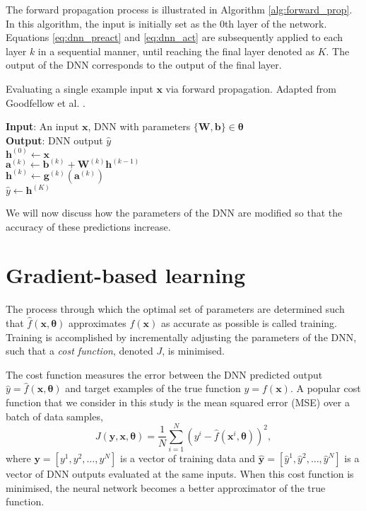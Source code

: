 The forward propagation process is illustrated in Algorithm \ref{alg:forward_prop}.
In this algorithm, the input is initially set as the 0th layer of the network.
Equations \ref{eq:dnn_preact} and \ref{eq:dnn_act} are subsequently applied to each layer $k$ in a sequential manner, until reaching the final layer denoted as $K$.
The output of the DNN corresponds to the output of the final layer.

\begin{algorithm}[htb!]
\caption[Evaluating a single example input via forward propagation]{Evaluating a single example input $\bm{x}$ via forward propagation. Adapted from Goodfellow et al. \cite{Goodfellow2016}.}
\label{alg:forward_prop}
\nonl\textbf{Input}: An input $\bm{x}$, DNN with parameters $\{\mathbf{W,b}\} \in \bm{\theta}$ \\
\nonl\textbf{Output}: DNN output $\hat{y}$ \\
\vspace{0.3cm} 
$\mathbf{h}^{(0)} \leftarrow \bm{x}$ \\
{
    $\mathbf{a}^{(k)} \leftarrow \mathbf{b}^{(k)} + \mathbf{W}^{(k)} \mathbf{h}^{(k-1)}$ \\
    $\mathbf{h}^{(k)} \leftarrow \mathbf{g}^{(k)}(\mathbf{a}^{(k)})$ \\
}
$\hat{y} \leftarrow \mathbf{h}^{(K)}$ \\
\end{algorithm}

We will now discuss how the parameters of the DNN are modified so that the accuracy of these predictions increase.




\section{Gradient-based learning}\label{sec:grad_des}
The process through which the optimal set of parameters are determined such that $\hat{f}(\bm{x}, \bm{\theta})$ approximates $f(\bm{x})$ as accurate as possible is called training.
Training is accomplished by incrementally adjusting the parameters of the DNN, such that a \emph{cost function}, denoted  $J$, is minimised. 

The cost function measures the error between the DNN predicted output $\hat{y} = \hat{f}(\bm{x}, \bm{\theta})$ and target examples of the true function $y = f(\bm{x})$. 
A popular cost  function that we consider in this study is the mean squared error (MSE) over a batch of data samples,
\begin{equation}
    J( \bm{y}, \bm{x}, \bm{\theta}) = \frac{1}{N} \sum_{i=1}^{N} (y^i - \hat{f}(\bm{x}^i, \bm{\theta}))^2,
    \label{eq:cost_function}
\end{equation}
where $\mathbf{y} = [ y^1, y^2, \ldots , y^N ]$ is a vector of training data and $\mathbf{\hat{y}} = [ \hat{y}^1, \hat{y}^2, \ldots , \hat{y}^N ]$ is a vector of DNN outputs evaluated at the same inputs.
When this cost function is minimised, the neural network becomes a better approximator of the true function.

